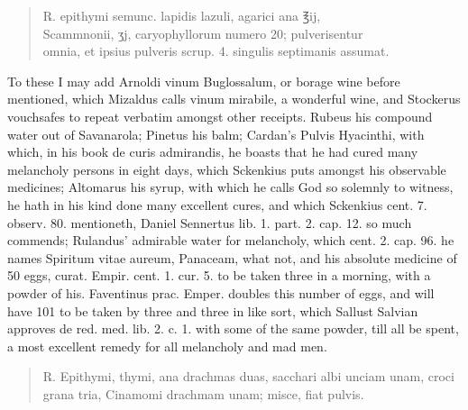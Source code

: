 \begin{quote}
\begin{latin}%
℞. epithymi semunc. lapidis lazuli, agarici ana ℥ij,\\
Scammnonii, ʒj, caryophyllorum numero 20; pulverisentur \\
omnia, et ipsius pulveris scrup. 4. singulis septimanis assumat.
\end{latin}
\end{quote}

To these I may add Arnoldi vinum Buglossalum, or borage wine before
mentioned, which Mizaldus calls vinum mirabile, a wonderful wine,
and Stockerus vouchsafes to repeat verbatim amongst other receipts.
Rubeus his compound water out of Savanarola; Pinetus his balm;
Cardan's Pulvis Hyacinthi, with which, in his book de curis admirandis,
he boasts that he had cured many melancholy persons in eight days,
which Sckenkius puts amongst his observable medicines; Altomarus
his syrup, with which he calls God so solemnly to witness, he
hath in his kind done many excellent cures, and which Sckenkius cent.
7. observ. 80. mentioneth, Daniel Sennertus lib. 1. part. 2. cap. 12.
so much commends; Rulandus' admirable water for melancholy, which cent.
2. cap. 96. he names Spiritum vitae aureum, Panaceam, what not, and his
absolute medicine of 50 eggs, curat. Empir. cent. 1. cur. 5. to be
taken three in a morning, with a powder of his. Faventinus prac.
Emper. doubles this number of eggs, and will have 101 to be taken by
three and three in like sort, which Sallust Salvian approves de red.
med. lib. 2. c. 1. with some of the same powder, till all be spent, a
most excellent remedy for all melancholy and mad men.

\begin{quote}
\begin{latin}%
℞. Epithymi, thymi, ana drachmas duas, sacchari albi unciam unam, croci
grana tria, Cinamomi drachmam unam; misce, fiat pulvis.
\end{latin}
\end{quote}

